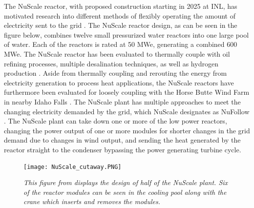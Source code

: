 The NuScale reactor, with proposed construction starting in 2025 at INL, has motivated research into different methods of flexibly operating the amount of electricity sent to the grid \cite{Ingersoll2014, Ingersoll2015, Ingersoll2016, Ingersoll2014_1}. The NuScale reactor design, as can be seen in the figure below, combines twelve small pressurized water reactors into one large pool of water.  Each of the reactors is rated at 50 MWe, generating a combined 600 MWe. The NuScale reactor has been evaluated to thermally couple with oil refining processes, multiple desalination techniques, as well as hydrogen production \cite{Ingersoll2014}. Aside from thermally coupling and rerouting the energy from electricity generation to process heat applications, the NuScale reactors have furthermore been evaluated for loosely coupling with the Horse Butte Wind Farm in nearby Idaho Falls \cite{Ingersoll2015}.  The NuScale plant has multiple approaches to meet the changing electricity demanded by the grid, which NuScale designates as NuFollow \cite{Ingersoll2015}.  The NuScale plant can take down one or more of the low power reactors, changing the power output of one or more modules for shorter changes in the grid demand due to changes in wind output, and sending the heat generated by the reactor straight to the condenser bypassing the power generating turbine cycle.
\begin{figure}[h!]
\texttt{[image: NuScale\_cutaway.PNG]}
\caption{\small \sl This figure from \cite{Ingersoll2014} displays the design of half of the NuScale plant. Six of the reactor modules can be seen in the cooling pool along with the crane which inserts and removes the modules.}
\label{nuscale}
\end{figure}

